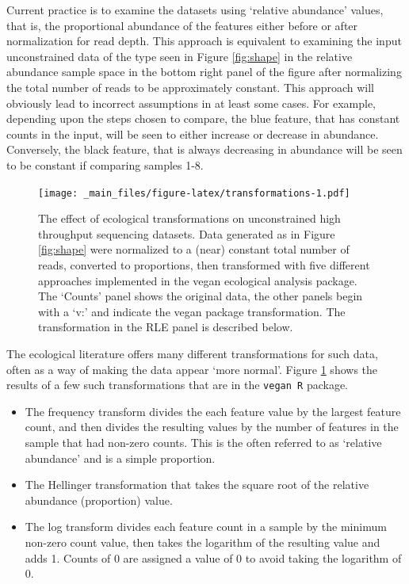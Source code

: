 \documentclass[onecolumn]{article}
\begin{document}
Current practice is to examine the datasets using `relative abundance' values, that is, the proportional abundance of the features either before or after normalization for read depth. This approach is equivalent to examining the input unconstrained data of the type seen in Figure \ref{fig:shape} in the relative abundance sample space in the bottom right panel of the figure after normalizing the total number of reads to be approximately constant. This approach will obviously lead to incorrect assumptions in at least some cases. For example, depending upon the steps chosen to compare, the blue feature, that has constant counts in the input, will be seen to either increase or decrease in abundance. Conversely, the black feature, that is always decreasing in abundance will be seen to be constant if comparing samples 1-8.

\begin{figure}
\centering
\texttt{[image: \_main\_files/figure-latex/transformations-1.pdf]}
\caption{\label{fig:transformations}The effect of ecological transformations on unconstrained high throughput sequencing datasets. Data generated as in Figure \ref{fig:shape} were normalized to a (near) constant total number of reads, converted to proportions, then transformed with five different approaches implemented in the vegan ecological analysis package. The `Counts' panel shows the original data, the other panels begin with a `v:' and indicate the vegan package transformation. The transformation in the RLE panel is described below.}
\end{figure}

The ecological literature offers many different transformations for such data, often as a way of making the data appear `more normal'. Figure \ref{fig:transformations} shows the results of a few such transformations that are in the \texttt{vegan\ R} package.

\begin{itemize}
\item
  The frequency transform divides the each feature value by the largest feature count, and then divides the resulting values by the number of features in the sample that had non-zero counts. This is the often referred to as `relative abundance' and is a simple proportion.
\item
  The Hellinger transformation that takes the square root of the relative abundance (proportion) value.
\item
  The log transform divides each feature count in a sample by the minimum non-zero count value, then takes the logarithm of the resulting value and adds 1. Counts of 0 are assigned a value of 0 to avoid taking the logarithm of 0.
\end{itemize}
\end{document}
